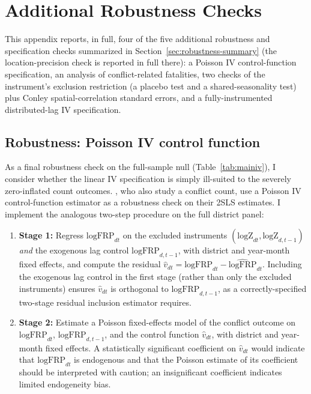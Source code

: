 \documentclass[12pt]{article}
\begin{document}
\section{Additional Robustness Checks}
\label{sec:appendixrobustness}

This appendix reports, in full, four of the five additional robustness and specification checks summarized in Section~\ref{sec:robustness-summary} (the location-precision check is reported in full there): a Poisson IV control-function specification, an analysis of conflict-related fatalities, two checks of the instrument's exclusion restriction (a placebo test and a shared-seasonality test) plus Conley spatial-correlation standard errors, and a fully-instrumented distributed-lag IV specification.

\subsection{Robustness: Poisson IV control function}
\label{sec:poisson}

As a final robustness check on the full-sample null (Table~\ref{tab:mainiv}), I consider whether the linear IV specification is simply ill-suited to the severely zero-inflated count outcomes. \citet{lu2023fish}, who also study a conflict count, use a Poisson IV control-function estimator \citep{terzabasurathouz2008} as a robustness check on their 2SLS estimates. I implement the analogous two-step procedure on the full district panel:

\begin{enumerate}
    \item \textbf{Stage 1:} Regress $\text{logFRP}_{dt}$ on the excluded instruments $(\text{logZ}_{dt}, \text{logZ}_{d,t-1})$ \emph{and} the exogenous lag control $\text{logFRP}_{d,t-1}$, with district and year-month fixed effects, and compute the residual $\hat{v}_{dt} = \text{logFRP}_{dt} - \widehat{\text{logFRP}}_{dt}$. Including the exogenous lag control in the first stage (rather than only the excluded instruments) ensures $\hat{v}_{dt}$ is orthogonal to $\text{logFRP}_{d,t-1}$, as a correctly-specified two-stage residual inclusion estimator requires.
    \item \textbf{Stage 2:} Estimate a Poisson fixed-effects model of the conflict outcome on $\text{logFRP}_{dt}$, $\text{logFRP}_{d,t-1}$, and the control function $\hat{v}_{dt}$, with district and year-month fixed effects. A statistically significant coefficient on $\hat{v}_{dt}$ would indicate that $\text{logFRP}_{dt}$ is endogenous and that the Poisson estimate of its coefficient should be interpreted with caution; an insignificant coefficient indicates limited endogeneity bias.
\end{enumerate}
\end{document}
